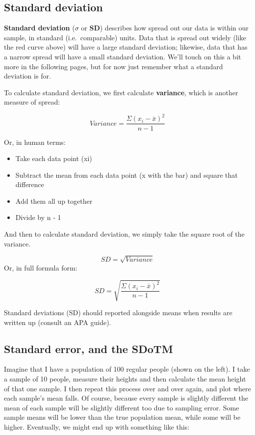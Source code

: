 \documentclass[
]{book}
\providecommand{\tightlist}{%
  \setlength{\itemsep}{0pt}\setlength{\parskip}{0pt}}
\begin{document}
\hypertarget{standard-deviation}{%
\subsection{Standard deviation}\label{standard-deviation}}

\textbf{Standard deviation} (\(\sigma\) or \textbf{SD}) describes how spread out our data is within our sample, in standard (i.e.~comparable) units. Data that is spread out widely (like the red curve above) will have a large standard deviation; likewise, data that has a narrow spread will have a small standard deviation. We'll touch on this a bit more in the following pages, but for now just remember what a standard deviation is for.

To calculate standard deviation, we first calculate \textbf{variance}, which is another measure of spread:

\[
 Variance = \frac{\Sigma (x_i - \bar{x} )^2}{n - 1}
\]

Or, in human terms:

\begin{itemize}
\tightlist
\item
  Take each data point (xi)
\item
  Subtract the mean from each data point (x with the bar) and square that difference
\item
  Add them all up together
\item
  Divide by n - 1
\end{itemize}

And then to calculate standard deviation, we simply take the square root of the variance.

\[
SD = \sqrt{Variance}
\]
Or, in full formula form:

\[
SD = \sqrt{\frac{\Sigma (x_i - \bar{x} )^2}{n - 1}}
\]

Standard deviations (SD) should reported alongside means when results are written up (consult an APA guide).

\hypertarget{standard-error-and-the-sdotm}{%
\subsection{Standard error, and the SDoTM}\label{standard-error-and-the-sdotm}}

Imagine that I have a population of 100 regular people (shown on the left). I take a sample of 10 people, measure their heights and then calculate the mean height of that one sample. I then repeat this process over and over again, and plot where each sample's mean falls. Of course, because every sample is slightly different the mean of each sample will be slightly different too due to sampling error. Some sample means will be lower than the true population mean, while some will be higher. Eventually, we might end up with something like this:
\end{document}
